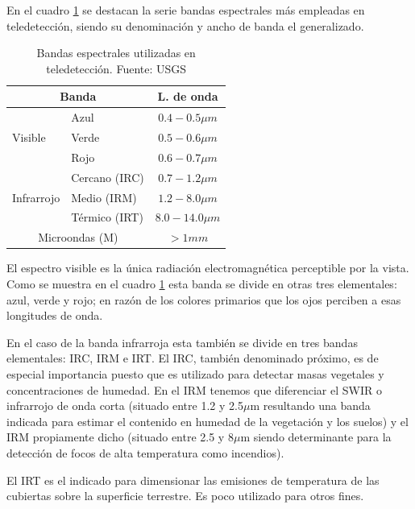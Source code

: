 En el cuadro \ref{tab:bandas} se destacan la serie bandas espectrales más empleadas en teledetección, siendo su denominación y ancho de banda el generalizado.\Sep

\begin{table}\centering
	\begin{tabular}{@{}llc@{}}
		\toprule[0.4mm]
		\multicolumn{2}{c}{\textbf{Banda}} & \textbf{L. de onda} \\
		\midrule
		\multirow{3}{*}{Visible} & Azul & $0.4-0.5{\mu}m$ \\
		& Verde & $0.5-0.6{\mu}m$ \\
		& Rojo & $0.6-0.7{\mu}m$ \\
		\midrule
		\multirow{3}{*}{Infrarrojo} & Cercano (IRC) & $0.7-1.2{\mu}m$ \\
		& Medio (IRM) & $1.2-8.0{\mu}m$ \\
		& Térmico (IRT) & $8.0-14.0{\mu}m$ \\
		\midrule
		\multicolumn{2}{c}{Microondas (M)} & $>1mm$\\
		\bottomrule[0.4mm]
	\end{tabular}
	\caption[Bandas espectrales utilizadas en teledetección]{Bandas espectrales utilizadas en teledetección. Fuente: USGS}
	\label{tab:bandas}
\end{table}

El espectro visible es la única radiación electromagnética perceptible por la vista. Como se muestra en el cuadro \ref{tab:bandas} esta banda se divide en otras tres elementales: azul, verde y rojo; en razón de los colores primarios que los ojos perciben a esas longitudes de onda.\Sep

En el caso de la banda infrarroja esta también se divide en tres bandas elementales: \ac{IRC}, \ac{IRM} e \ac{IRT}. El \ac{IRC}, también denominado próximo, es de especial importancia puesto que es utilizado para detectar masas vegetales y concentraciones de humedad. En el \ac{IRM} tenemos que diferenciar el \ac{SWIR} o infrarrojo de onda corta (situado entre 1.2 y 2.5$\mu$m resultando una banda indicada para estimar el contenido en humedad de la vegetación y los suelos) y el \ac{IRM} propiamente dicho (situado entre 2.5 y 8$\mu$m siendo determinante para la detección de focos de alta temperatura como incendios).\Sep

El \ac{IRT} es el indicado para dimensionar las emisiones de temperatura de las cubiertas sobre la superficie terrestre. Es poco utilizado para otros fines.\Sep

